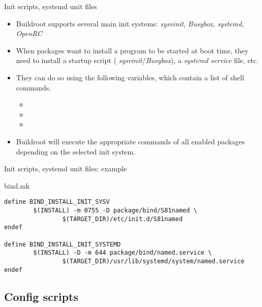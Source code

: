 \begin{frame}{Init scripts, systemd unit files}

\begin{itemize}

\item Buildroot supports several main init systems: {\em sysvinit},
  {\em Busybox}, {\em systemd}, {\em OpenRC}

\item When packages want to install a program to be started at boot
  time, they need to install a startup script ({\em
    sysvinit}/{\em Busybox}), a {\em systemd service} file, etc.

\item They can do so using the following variables, which contain a
  list of shell commands.
  \begin{itemize}
  \item {}
  \item {}
  \item {}
  \end{itemize}

\item Buildroot will execute the appropriate
   commands of all enabled packages
  depending on the selected init system.

\end{itemize}

\end{frame}

\begin{frame}[fragile]{Init scripts, systemd unit files: example}

\begin{block}{bind.mk}
  \begin{verbatim}
define BIND_INSTALL_INIT_SYSV
        $(INSTALL) -m 0755 -D package/bind/S81named \
                $(TARGET_DIR)/etc/init.d/S81named
endef

define BIND_INSTALL_INIT_SYSTEMD
        $(INSTALL) -D -m 644 package/bind/named.service \
                $(TARGET_DIR)/usr/lib/systemd/system/named.service
endef
  \end{verbatim}
\end{block}

\end{frame}

\subsection{Config scripts}

